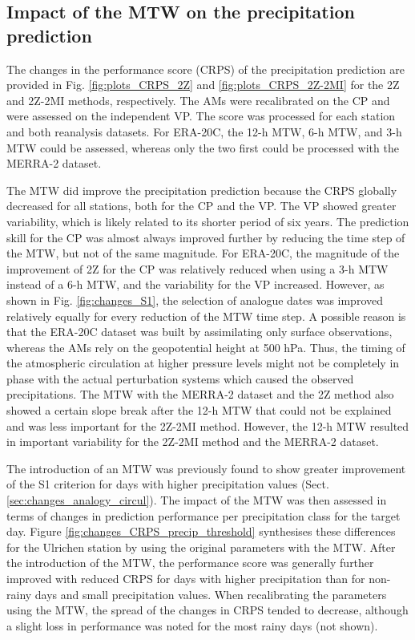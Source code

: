 \documentclass[hess, manuscript]{copernicus}
\begin{document}
	
	\subsection{Impact of the MTW on the precipitation prediction}
	\label{sec:influence_scores}
	
	The changes in the performance score (CRPS) of the precipitation prediction are provided in Fig. \ref{fig:plots_CRPS_2Z} and \ref{fig:plots_CRPS_2Z-2MI} for the 2Z and 2Z-2MI methods, respectively. The AMs were recalibrated on the CP and were assessed on the independent VP. The score was processed for each station and both reanalysis datasets. For ERA-20C, the 12-h MTW, 6-h MTW, and 3-h MTW could be assessed, whereas only the two first could be processed with the MERRA-2 dataset.
	
	The MTW did improve the precipitation prediction because the CRPS globally decreased for all stations, both for the CP and the VP. The VP showed greater variability, which is likely related to its shorter period of six years. The prediction skill for the CP was almost always improved further by reducing the time step of the MTW, but not of the same magnitude. For ERA-20C, the magnitude of the improvement of 2Z for the CP was relatively reduced when using a 3-h MTW instead of a 6-h MTW, and the variability for the VP increased. However, as shown in Fig. \ref{fig:changes_S1}, the selection of analogue dates was improved relatively equally for every reduction of the MTW time step. A possible reason is that the ERA-20C dataset was built by assimilating only surface observations, whereas the AMs rely on the geopotential height at 500 hPa. Thus, the timing of the atmospheric circulation at higher pressure levels might not be completely in phase with the actual perturbation systems which caused the observed precipitations. The MTW with the MERRA-2 dataset and the 2Z method also showed a certain slope break after the 12-h MTW that could not be explained and was less important for the 2Z-2MI method. However, the 12-h MTW resulted in important variability for the 2Z-2MI method and the MERRA-2 dataset.
	
	The introduction of an MTW was previously found to show greater improvement of the S1 criterion for days with higher precipitation values (Sect. \ref{sec:changes_analogy_circul}). The impact of the MTW was then assessed in terms of changes in prediction performance per precipitation class for the target day. Figure \ref{fig:changes_CRPS_precip_threshold} synthesises these differences for the Ulrichen station by using the original parameters with the MTW. After the introduction of the MTW, the performance score was generally further improved with reduced CRPS for days with higher precipitation than for non-rainy days and small precipitation values. When recalibrating the parameters using the MTW, the spread of the changes in CRPS tended to decrease, although a slight loss in performance was noted for the most rainy days (not shown).
	
\end{document}
